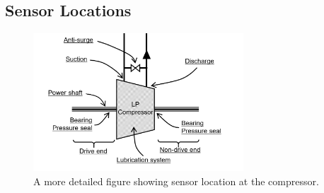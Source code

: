 \documentclass[11pt]{article} %
\theoremstyle{plain}
\theoremstyle{definition}
\begin{document}
\begin{appendices}
\section{Sensor Locations}
\begin{figure}[H]
	\centering
	\includegraphics[width=0.7\textwidth]{lp-stage.PNG}
	\caption{A more detailed figure showing sensor location at the compressor.}
	\label{fig:lp-stage}
\end{figure}


\end{appendices}

\newpage


\end{document}
